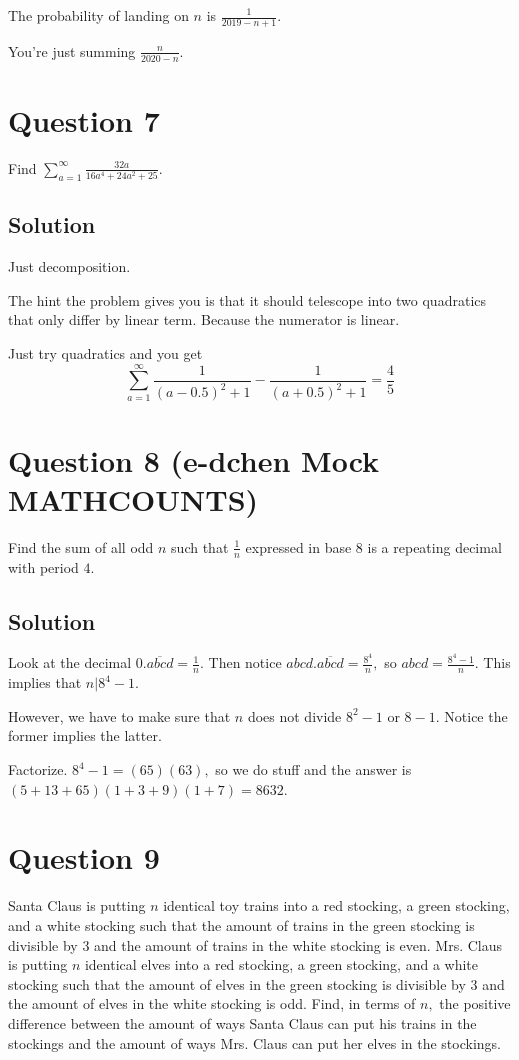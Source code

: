 \documentclass{article}
\begin{document}
The probability of landing on $n$ is $\frac{1}{2019-n+1}.$

You're just summing $\frac{n}{2020-n}.$

\pagebreak\section{Question 7}

Find $\sum\limits_{a=1}^{\infty}\frac{32a}{16a^4+24a^2+25}.$

\subsection{Solution}

Just decomposition.

The hint the problem gives you is that it should telescope into two quadratics that only differ by linear term. Because the numerator is linear.

Just try quadratics and you get
\[\sum\limits_{a=1}^{\infty}\frac{1}{(a-0.5)^2+1}-\frac{1}{(a+0.5)^2+1}=\frac{4}{5}\]

\pagebreak\section{Question 8 (e-dchen Mock MATHCOUNTS)}

Find the sum of all odd $n$ such that $\frac{1}{n}$ expressed in base $8$ is a repeating decimal with period $4.$

\subsection{Solution}

Look at the decimal $0.\overline{abcd}=\frac{1}{n}.$ Then notice $abcd.\overline{abcd}=\frac{8^4}{n},$ so $abcd=\frac{8^4-1}{n}.$ This implies that $n|8^4-1.$

However, we have to make sure that $n$ does not divide $8^2-1$ or $8-1.$ Notice the former implies the latter.

Factorize. $8^4-1=(65)(63),$ so we do stuff and the answer is $(5+13+65)(1+3+9)(1+7)=8632.$

\pagebreak\section{Question 9}

Santa Claus is putting $n$ identical toy trains into a red stocking, a green stocking, and a white stocking such that the amount of trains in the green stocking is divisible by $3$ and the amount of trains in the white stocking is even. Mrs. Claus is putting $n$ identical elves into a red stocking, a green stocking, and a white stocking such that the amount of elves in the green stocking is divisible by $3$ and the amount of elves in the white stocking is odd. Find, in terms of $n,$ the positive difference between the amount of ways Santa Claus can put his trains in the stockings and the amount of ways Mrs. Claus can put her elves in the stockings.
\end{document}
